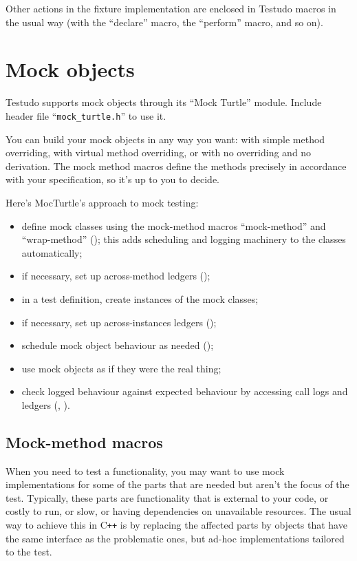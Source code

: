 \documentclass[twoside, a4paper, article]{memoir}
\newcommand\typesetexample[1]{%
  \typesetexamplesource{#1}
}
\providecommand\typesetexamplesource[1]{%
}
\newcommand*\Cpp{C\texttt{++}}
\begin{document}
Other actions in the fixture implementation are enclosed in Testudo macros in
the usual way (with the ``declare'' macro, the ``perform'' macro, and so on).


\chapter{Mock objects}
\label{cha:mock-objects}

Testudo supports mock objects through its ``Mock Turtle'' module.  Include
header file ``\texttt{mock\_turtle.h}'' to use it.

\typesetexample{include-mock-turtle}

You can build your mock objects in any way you want: with simple method
overriding, with virtual method overriding, or with no overriding and no
derivation.  The mock method macros define the methods precisely in accordance
with your specification, so it's up to you to decide.

Here's MocTurtle's approach to mock testing:
\begin{itemize}
\item define mock classes using the mock-method macros ``mock-method'' and
  ``wrap-method'' (); this adds scheduling and
  logging machinery to the classes automatically;
\item if necessary, set up across-method ledgers
  ();
\item in a test definition, create instances of the mock classes;
\item if necessary, set up across-instances ledgers
  ();
\item schedule mock object behaviour as needed
  ();
\item use mock objects as if they were the real thing;
\item check logged behaviour against expected behaviour by accessing call logs
  and ledgers (, ).
\end{itemize}

\section{Mock-method macros}
\label{sec:mock-method-macros}

When you need to test a functionality, you may want to use mock implementations
for some of the parts that are needed but aren't the focus of the test.
Typically, these parts are functionality that is external to your code, or
costly to run, or slow, or having dependencies on unavailable resources.  The
usual way to achieve this in \Cpp{} is by replacing the affected parts by
objects that have the same interface as the problematic ones, but ad-hoc
implementations tailored to the test.
\end{document}
